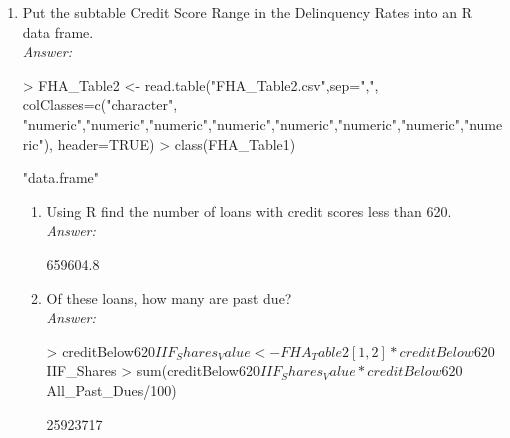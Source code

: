 \documentclass{article}
\begin{document}
\begin{enumerate}
\begin{enumerate}
			\item Put the subtable Credit Score Range in the Delinquency Rates into an R data frame.\\
			\emph{Answer:}
\begin{Schunk}
\begin{Sinput}
> FHA_Table2 <- read.table("FHA_Table2.csv",sep=",", colClasses=c("character", "numeric","numeric","numeric","numeric","numeric","numeric","numeric","numeric"), header=TRUE)	
> class(FHA_Table1)
\end{Sinput}
\begin{Soutput}
[1] "data.frame"
\end{Soutput}
\end{Schunk}
			\begin{enumerate}
				\item Using R find the number of loans with credit scores less than 620.\\
				\emph{Answer:}
					\begin{center}
\begin{Schunk}
\begin{Soutput}
[1] 659604.8
\end{Soutput}
\end{Schunk}
					\end{center}

				\item Of these loans, how many are past due?\\
				\emph{Answer:}
					\begin{center}
\begin{Schunk}
\begin{Sinput}
> creditBelow620$IIF_Shares_Value <- FHA_Table2[1,2] * creditBelow620$IIF_Shares
> sum(creditBelow620$IIF_Shares_Value * creditBelow620$All_Past_Dues/100)
\end{Sinput}
\begin{Soutput}
[1] 25923717
\end{Soutput}
\end{Schunk}
					\end{center}


\end{enumerate}
\end{enumerate}
\end{enumerate}
\end{document}
